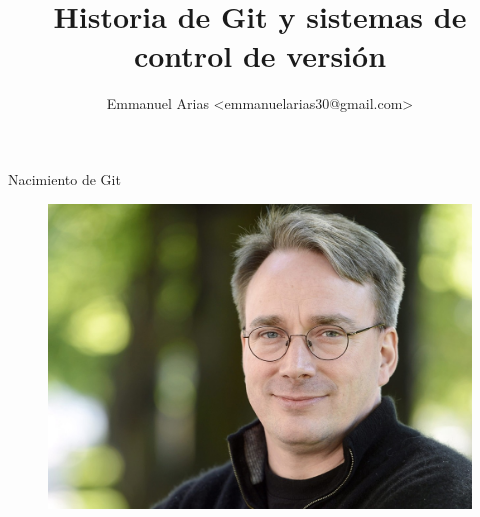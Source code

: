 \documentclass{beamer}
\title{Historia de Git y sistemas de control de versión}
\author{Emmanuel Arias <emmanuelarias30@gmail.com>}
\begin{document}
\begin{frame}[plain]
    \maketitle
\end{frame}
\begin{frame}{Nacimiento de Git}
\begin{figure}[H]
	\centering
	\includegraphics[width=0.7\linewidth]{img/LinusTorvalds}
	\label{fig:linustorvalds}
\end{figure}

\end{frame}
\end{document}
